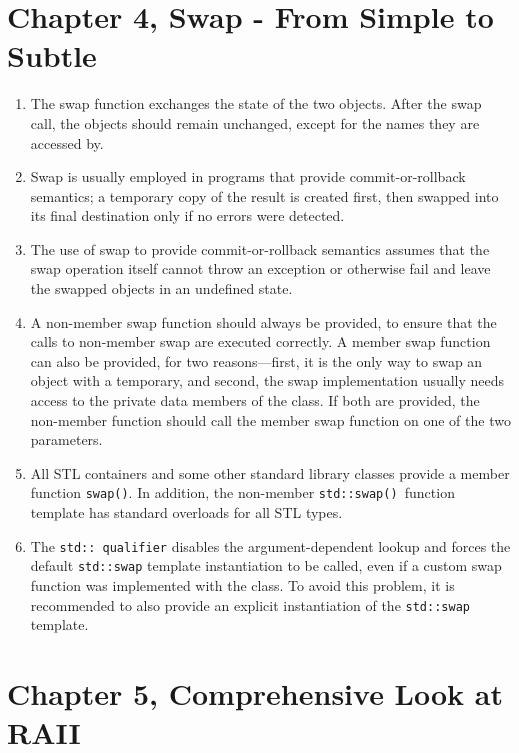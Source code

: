 \section{Chapter 4, Swap - From Simple to Subtle}

\begin{enumerate}
\item
  The swap function exchanges the state of the two objects. After the swap call, the objects should remain unchanged, except for the names they are accessed by.
\item
  Swap is usually employed in programs that provide commit-or-rollback semantics; a temporary copy of the result is created first, then swapped into its final destination only if no errors were detected.
\item
  The use of swap to provide commit-or-rollback semantics assumes that the swap operation itself cannot throw an exception or otherwise fail and leave the swapped objects in an undefined state.
\item
  A non-member swap function should always be provided, to ensure that the calls to non-member swap are executed correctly. A member swap function can also be provided, for two reasons---first, it is the only way to swap an object with a temporary, and second, the swap implementation usually needs access to the private data members of the class. If both are provided, the non-member function should call the member swap function on one of the two parameters.
\item
  All STL containers and some other standard library classes provide a member function \texttt{swap()}. In addition, the non-member \texttt{std::swap()\ }function template has standard overloads for all STL types.
\item
  The \texttt{std::\ qualifier} disables the argument-dependent lookup and forces the default \texttt{std::swap} template instantiation to be called, even if a custom swap function was implemented with the class. To avoid this problem, it is recommended to also provide an explicit instantiation of the \texttt{std::swap} template.
\end{enumerate}

\section{Chapter 5, Comprehensive Look at RAII}

